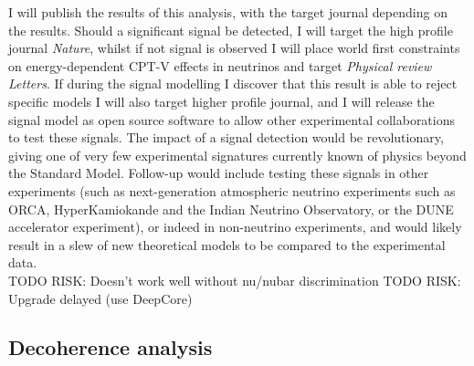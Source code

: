 \documentclass[a4paper,11pt]{article}
\newcounter{bar}
\begin{document}
I will publish the results of this analysis, with the target journal depending on the results. Should a significant signal be detected, I will target the high profile journal \textit{Nature}, whilst if not signal is observed I will place world first constraints on energy-dependent CPT-V effects in neutrinos and target \textit{Physical review Letters}. If during the signal modelling I discover that this result is able to reject specific models I will also target higher profile journal, and I will release the signal model as open source software to allow other experimental collaborations to test these signals. The impact of a signal detection would be revolutionary, giving one of very few experimental signatures currently known of physics beyond the Standard Model. Follow-up would include testing these signals in other experiments (such as next-generation atmospheric neutrino experiments such as ORCA, HyperKamiokande and the Indian Neutrino Observatory, or the DUNE accelerator experiment), or indeed in non-neutrino experiments, and would likely result in a slew of new theoretical models to be compared to the experimental data. \\

TODO RISK: Doesn't work well without nu/nubar discrimination
TODO RISK: Upgrade delayed (use DeepCore)

\subsection{Decoherence analysis}
\end{document}
